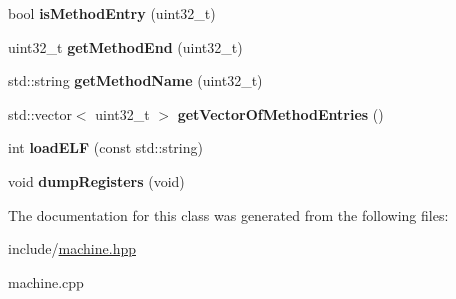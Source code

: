 \begin{DoxyCompactItemize}
\item 
bool {\bfseries is\+Method\+Entry} (uint32\+\_\+t)\hypertarget{classdbt_1_1_machine_a4f5784f71f9d14d9c01ed228522c9375}{}\label{classdbt_1_1_machine_a4f5784f71f9d14d9c01ed228522c9375}

\item 
uint32\+\_\+t {\bfseries get\+Method\+End} (uint32\+\_\+t)\hypertarget{classdbt_1_1_machine_a5d1862fd7737f7d079b04228fce10faa}{}\label{classdbt_1_1_machine_a5d1862fd7737f7d079b04228fce10faa}

\item 
std\+::string {\bfseries get\+Method\+Name} (uint32\+\_\+t)\hypertarget{classdbt_1_1_machine_aff3a71490f57e0fd9698ae9f7430d83e}{}\label{classdbt_1_1_machine_aff3a71490f57e0fd9698ae9f7430d83e}

\item 
std\+::vector$<$ uint32\+\_\+t $>$ {\bfseries get\+Vector\+Of\+Method\+Entries} ()\hypertarget{classdbt_1_1_machine_a9a9d0ad83e3c253b6040faf33fcc9f15}{}\label{classdbt_1_1_machine_a9a9d0ad83e3c253b6040faf33fcc9f15}

\item 
int {\bfseries load\+E\+LF} (const std\+::string)\hypertarget{classdbt_1_1_machine_a2485da4c30d718398747d2c6ad094fb5}{}\label{classdbt_1_1_machine_a2485da4c30d718398747d2c6ad094fb5}

\item 
void {\bfseries dump\+Registers} (void)\hypertarget{classdbt_1_1_machine_a3b23f005ac2ca3ae3fef7b58af002119}{}\label{classdbt_1_1_machine_a3b23f005ac2ca3ae3fef7b58af002119}

\end{DoxyCompactItemize}


The documentation for this class was generated from the following files\+:\begin{DoxyCompactItemize}
\item 
include/\hyperlink{machine_8hpp}{machine.\+hpp}\item 
machine.\+cpp\end{DoxyCompactItemize}
